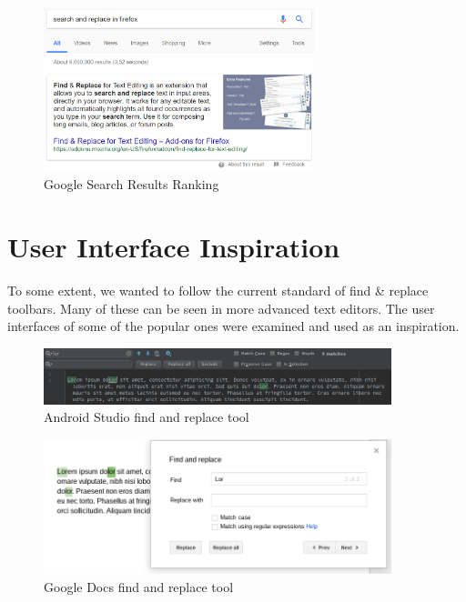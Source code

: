 \documentclass[bsc,frontabs,twoside,singlespacing,parskip,deptreport]{infthesis}
\begin{document}
\begin{figure}[h]
\centering
\includegraphics[width=0.7\textwidth]{../docs/search-results.png}
\caption{Google Search Results Ranking}
\end{figure}

\section{User Interface Inspiration}
To some extent, we wanted to follow the current standard of find \& replace toolbars. Many of these can be seen in more advanced text editors. The user interfaces of some of the popular ones were examined and used as an inspiration.

\begin{figure}[hp]
\centering
\includegraphics[width=0.9\textwidth]{../docs/editor-find-and-replace/android-studio-find-and-replace.png}
\caption{Android Studio find and replace tool}
\end{figure}

\begin{figure}[hp]
\centering
\includegraphics[width=0.9\textwidth]{../docs/editor-find-and-replace/gdocs-find-and-replace.png}
\caption{Google Docs find and replace tool}
\end{figure}
\end{document}

